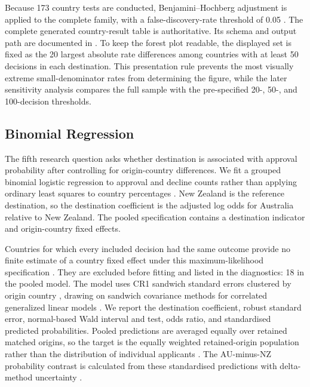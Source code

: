 \documentclass[runningheads]{llncs}
\begin{document}
Because 173 country tests are conducted, Benjamini--Hochberg adjustment is applied to the complete family, with a false-discovery-rate threshold of 0.05 \cite{BenjaminiHochberg1995}. The complete generated country-result table is authoritative. Its schema and output path are documented in  \cite{Kaplan2026AUNZComparisonRepository}. To keep the forest plot readable, the displayed set is fixed as the 20 largest absolute rate differences among countries with at least 50 decisions in each destination. This presentation rule prevents the most visually extreme small-denominator rates from determining the figure, while the later sensitivity analysis compares the full sample with the pre-specified 20-, 50-, and 100-decision thresholds.

\subsection{Binomial Regression}

The fifth research question asks whether destination is associated with approval probability after controlling for origin-country differences. We fit a grouped binomial logistic regression to approval and decline counts rather than applying ordinary least squares to country percentages \cite{NelderWedderburn1972}. New Zealand is the reference destination, so the destination coefficient is the adjusted log odds for Australia relative to New Zealand. The pooled specification contains a destination indicator and origin-country fixed effects.

Countries for which every included decision had the same outcome provide no finite estimate of a country fixed effect under this maximum-likelihood specification \cite{AlbertAnderson1984}. They are excluded before fitting and listed in the diagnostics: 18 in the pooled model. The model uses CR1 sandwich standard errors clustered by origin country \cite{CameronMiller2015}, drawing on sandwich covariance methods for correlated generalized linear models \cite{LiangZeger1986}. We report the destination coefficient, robust standard error, normal-based Wald interval and test, odds ratio, and standardised predicted probabilities. Pooled predictions are averaged equally over retained matched origins, so the target is the equally weighted retained-origin population rather than the distribution of individual applicants \cite{MullerMacLehose2014}. The AU-minus-NZ probability contrast is calculated from these standardised predictions with delta-method uncertainty \cite{Oehlert1992}.
\end{document}
